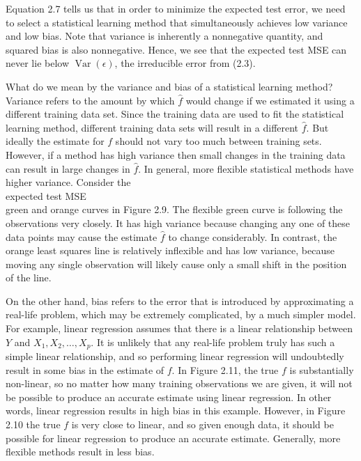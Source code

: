 \documentclass[10pt]{article}
\begin{document}
Equation 2.7 tells us that in order to minimize the expected test error, we need to select a statistical learning method that simultaneously achieves low variance and low bias. Note that variance is inherently a nonnegative quantity, and squared bias is also nonnegative. Hence, we see that the expected test MSE can never lie below $\operatorname{Var}(\epsilon)$, the irreducible error from (2.3).

What do we mean by the variance and bias of a statistical learning method? Variance refers to the amount by which $\hat{f}$ would change if we estimated it using a different training data set. Since the training data are used to fit the statistical learning method, different training data sets will result in a different $\hat{f}$. But ideally the estimate for $f$ should not vary too much between training sets. However, if a method has high variance then small changes in the training data can result in large changes in $\hat{f}$. In general, more flexible statistical methods have higher variance. Consider the\\
expected test MSE\\
green and orange curves in Figure 2.9. The flexible green curve is following the observations very closely. It has high variance because changing any one of these data points may cause the estimate $\hat{f}$ to change considerably. In contrast, the orange least squares line is relatively inflexible and has low variance, because moving any single observation will likely cause only a small shift in the position of the line.

On the other hand, bias refers to the error that is introduced by approximating a real-life problem, which may be extremely complicated, by a much simpler model. For example, linear regression assumes that there is a linear relationship between $Y$ and $X_{1}, X_{2}, \ldots, X_{p}$. It is unlikely that any real-life problem truly has such a simple linear relationship, and so performing linear regression will undoubtedly result in some bias in the estimate of $f$. In Figure 2.11, the true $f$ is substantially non-linear, so no matter how many training observations we are given, it will not be possible to produce an accurate estimate using linear regression. In other words, linear regression results in high bias in this example. However, in Figure 2.10 the true $f$ is very close to linear, and so given enough data, it should be possible for linear regression to produce an accurate estimate. Generally, more flexible methods result in less bias.
\end{document}
